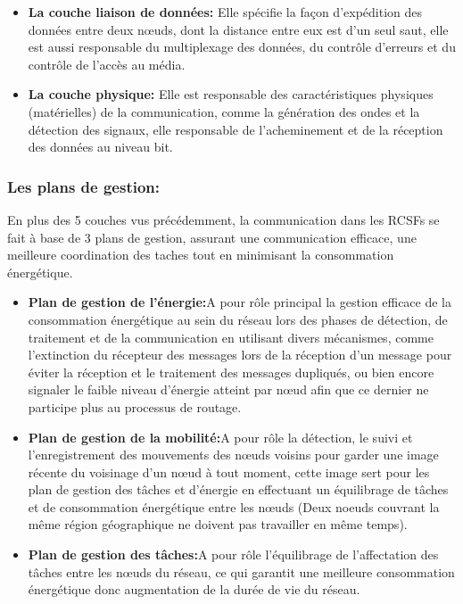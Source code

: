\begin{itemize}
  \item \textbf{La couche liaison de données:} Elle spécifie la façon d'expédition des données entre deux nœuds, dont la distance entre eux est d'un seul saut, elle est aussi responsable du multiplexage des données, du contrôle d'erreurs et du contrôle de l'accès au média.   \\
  
  \item \textbf{La couche physique:}  Elle est responsable des caractéristiques physiques (matérielles) de la communication, comme la génération des ondes et la détection des signaux, elle responsable de l'acheminement et de la réception des données au niveau bit.   \\ 
\end{itemize}


\subsubsection{Les plans de gestion:}
En plus des 5 couches vus précédemment, la communication dans les RCSFs se fait à base de 3 plans de gestion, assurant une communication efficace, une meilleure coordination des taches tout en minimisant la consommation énergétique.

\begin{itemize}
 \item \textbf{Plan de gestion de l'énergie:}A pour rôle principal la gestion efficace de la consommation énergétique au sein du réseau lors des phases de détection, de traitement et de la communication en utilisant divers mécanismes, comme l'extinction du récepteur des messages lors de la réception d'un message pour éviter la réception et le traitement des messages dupliqués, ou bien encore signaler le faible niveau d'énergie atteint par nœud afin que ce dernier ne participe plus au processus de routage.\\
 
 \item \textbf{Plan de gestion de la mobilité:}A pour rôle la détection, le suivi et l'enregistrement des mouvements des nœuds voisins  pour garder une image récente du voisinage d'un nœud à tout moment, cette image sert pour les plan de gestion des tâches et d'énergie en effectuant un équilibrage de tâches et de consommation énergétique entre les nœuds (Deux noeuds couvrant la même région géographique ne doivent pas travailler en même temps).  \\
 
 \item \textbf{Plan de gestion des tâches:}A pour rôle l'équilibrage de l'affectation des tâches entre les nœuds du réseau, ce qui garantit une meilleure consommation énergétique donc augmentation de la durée de vie du réseau.

\end{itemize}	
   
 